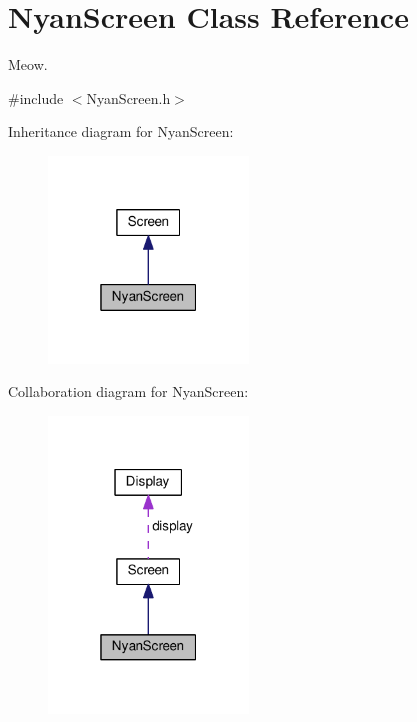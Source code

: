 \hypertarget{classNyanScreen}{}\section{Nyan\+Screen Class Reference}
\label{classNyanScreen}


Meow.  




{\ttfamily \#include $<$Nyan\+Screen.\+h$>$}



Inheritance diagram for Nyan\+Screen\+:\nopagebreak
\begin{figure}[H]
\begin{center}
\leavevmode
\includegraphics[width=151pt]{classNyanScreen__inherit__graph}
\end{center}
\end{figure}


Collaboration diagram for Nyan\+Screen\+:\nopagebreak
\begin{figure}[H]
\begin{center}
\leavevmode
\includegraphics[width=151pt]{classNyanScreen__coll__graph}
\end{center}
\end{figure}
